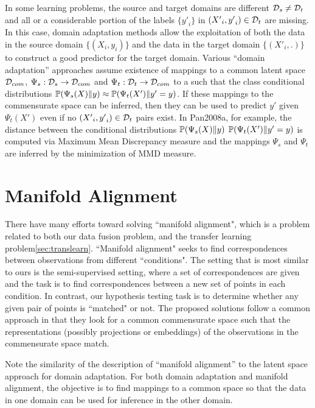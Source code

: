 \documentclass[12pt,oneside,final]{thesis}\usepackage[]{graphicx}\usepackage[]{color}
\begin{document}
 In some learning problems, the source and target domains are different ${\mathcal{D}}_s \neq {\mathcal{D}}_t$ and all or a considerable portion of  the labels $\{{y'}_i\}$  in $\left({X'}_i,{y'}_i\right) \in {\mathcal{D}}_t$ are missing. In this case, domain adaptation methods allow the exploitation of both the  data in the source domain $\{\left({X}_i,{y}_i\right)\}$ and the data in the target domain  $\{\left({X'}_i,.\right)\}$ to construct a good predictor for the target domain\cite{DaumeIII2006,Ben-David_Dom_Adapt2007,Ling2008,Pan2008a}.
Various ``domain adaptation'' approaches\cite{Pan2008a,LowRankSharedConceptChen2012a} assume existence of mappings to a common latent space ${\mathcal{D}}_{com}$,  $\Psi_s:{\mathcal{D}}_s \rightarrow {\mathcal{D}}_{com} $ and $\Psi_t:{\mathcal{D}}_t \rightarrow {\mathcal{D}}_{com}$ to a  such that the class conditional distributions $\mathbb{P}(\Psi_s(X) \|y) \approx \mathbb{P}(\Psi_t(X') \| y'=y)$.  If these mappings to the commensurate space can be inferred, then they can be used to predict $y'$ given $\Psi_t(X')$ even if no $\left({X'}_i,{y'}_i\right) \in {\mathcal{D}}_t$ pairs exist. 
In {Pan2008a}, for example, the distance between the conditional distributions $\mathbb{P}(\Psi_s(X) \|y) $ $\mathbb{P}(\Psi_t(X') \| y'=y)$ is computed via  Maximum Mean Discrepancy
measure and  the mappings $\Psi_s$ and  $\Psi_t$  are inferred by the minimization of MMD measure.

\section[Manifold Matching]{Manifold Alignment}
There have many efforts toward solving ``manifold alignment", which is a problem related to both our data fusion problem, and the transfer learning problem\ref{sec:translearn}. ``Manifold alignment" seeks to find correspondences between observations from different ``conditions". The setting that is most similar to ours is the semi-supervised setting, where a set of correspondences are given and the task is to find correspondences between a new set of points in each condition. In contrast, our hypothesis testing task is to determine whether any given pair of points is ``matched" or not. The proposed solutions follow a common approach in that they look for a common commensurate space such that the representations (possibly projections or embeddings) of the observations in the commensurate space match.

Note the similarity of the  description of ``manifold alignment''   to the latent space approach for domain adaptation. For both domain adaptation and manifold alignment, the objective is to find mappings to a  common space  so that the data in  one domain can be used for inference in the other domain.
\end{document}

